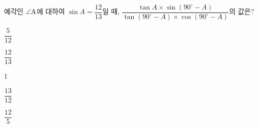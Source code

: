 예각인 $\angle\mathrm{A}$에 대하여 $\sin A=\dfrac{12}{13}$일 때, $\dfrac{\tan A\times\sin(90^\circ-A)}{\tan(90^\circ-A)\times\cos(90^\circ-A)}$의 값은?
\begin{choices32}{\rule[-3ex]{0pt}{8ex}$\dfrac{5}{12}$}{\rule[-3ex]{0pt}{8ex}$\dfrac{12}{13}$}{\rule[-3ex]{0pt}{8ex}$1$}{\rule[-3ex]{0pt}{8ex}$\dfrac{13}{12}$}{\rule[-3ex]{0pt}{8ex}$\dfrac{12}{5}$}\end{choices32}
